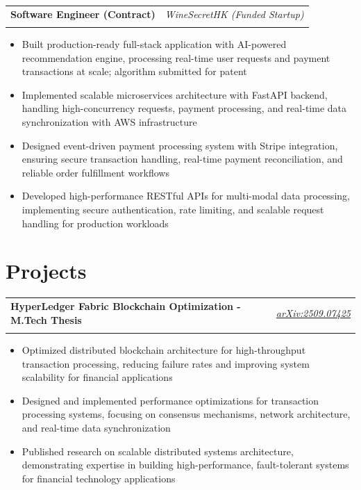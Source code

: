 \documentclass[11pt,a4paper]{article}
\makeatletter
\newcommand{\resumeItem}[1]{\item\small{#1}}
\newlength{\resumeLeftCol}
\newlength{\resumeRightCol}
\newcommand{\resumeHeading}[4]{
  \begin{tabular*}{\textwidth}{@{}p{\resumeLeftCol}@{\extracolsep{\fill}}>{\raggedleft\arraybackslash}p{\resumeRightCol}@{}}
    \textbf{#1} & \textit{#2} \\
    & \textit{\ifstrempty{#4}{#3}{#3 \ #4}}
  \end{tabular*}
  \vspace{-4pt}
}
\makeatother
\begin{document}
\resumeHeading{Software Engineer (Contract)}{WineSecretHK (Funded Startup)}{Contract}{}
\begin{itemize}[leftmargin=*,noitemsep,topsep=0pt]
    \resumeItem{Built production-ready full-stack application with AI-powered recommendation engine, processing real-time user requests and payment transactions at scale; algorithm submitted for patent}
    \resumeItem{Implemented scalable microservices architecture with FastAPI backend, handling high-concurrency requests, payment processing, and real-time data synchronization with AWS infrastructure}
    \resumeItem{Designed event-driven payment processing system with Stripe integration, ensuring secure transaction handling, real-time payment reconciliation, and reliable order fulfillment workflows}
    \resumeItem{Developed high-performance RESTful APIs for multi-modal data processing, implementing secure authentication, rate limiting, and scalable request handling for production workloads}
\end{itemize}

\section{Projects}
\resumeHeading{HyperLedger Fabric Blockchain Optimization - M.Tech Thesis}{\href{https://arxiv.org/abs/2509.07425}{arXiv:2509.07425}}{IIT Hyderabad}{2024-2025}
\begin{itemize}[leftmargin=*,noitemsep,topsep=0pt]
    \resumeItem{Optimized distributed blockchain architecture for high-throughput transaction processing, reducing failure rates and improving system scalability for financial applications}
    \resumeItem{Designed and implemented performance optimizations for transaction processing systems, focusing on consensus mechanisms, network architecture, and real-time data synchronization}
    \resumeItem{Published research on scalable distributed systems architecture, demonstrating expertise in building high-performance, fault-tolerant systems for financial technology applications}
\end{itemize}

\end{document}
